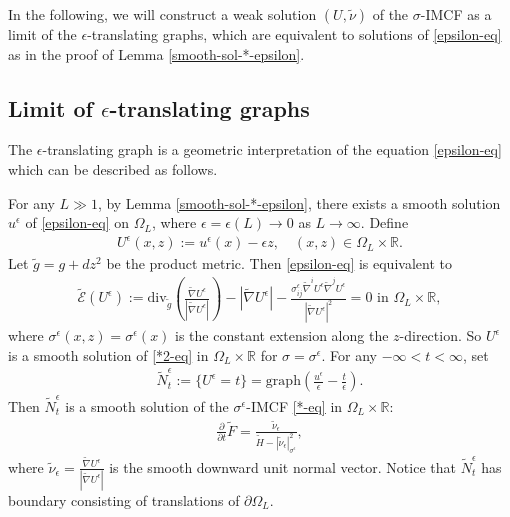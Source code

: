 \documentclass[11pt, letterpaper]{amsart}
\theoremstyle{definition}
\theoremstyle{remark}
\begin{document}
In the following, we will construct a weak solution $(U, \tilde{\nu })$ of the $\sigma $-IMCF as a limit of the $\epsilon $-translating graphs, which are equivalent to solutions of \ref{epsilon-eq} as in the proof of Lemma \ref{smooth-sol-*-epsilon}.

\subsection{Limit of $\epsilon $-translating graphs}\label{section-limit-translating}
 The $\epsilon $-translating graph is a geometric interpretation of the equation \ref{epsilon-eq}  which can be described as follows. 


 For any $L \gg 1$, by Lemma \ref{smooth-sol-*-epsilon}, there exists a smooth solution $u ^{\epsilon }$ of \ref{epsilon-eq} on $\Omega _{L}$, where $\epsilon = \epsilon (L) \to 0$ as $L\to \infty$. Define
\begin{align}
	U ^{\epsilon }(x,z):= u ^{\epsilon }(x) - \epsilon z,\quad (x,z) \in \Omega _{L} \times \mathbb{R}.
\end{align}
Let $\tilde{g}= g + dz ^2$ be the product metric. Then \ref{epsilon-eq} is equivalent to 
\begin{align}
	\tilde{\mathcal{E}}(U^{\epsilon }):= \mathrm{div}_{\tilde{g}}\left( \frac{\tilde{\nabla } U^{\epsilon }}{|\tilde{\nabla } U^{\epsilon }|} \right) - |\tilde{\nabla }U ^{\epsilon }| - \frac{\sigma ^{\epsilon } _{ij} \tilde{\nabla }^{i} U^{\epsilon } \tilde{\nabla }^{j} U^{\epsilon }}{|\tilde{\nabla }U^{\epsilon }|^2} = 0 \text{ in } \Omega _{L} \times \mathbb{R},
\end{align}
where $\sigma ^{\epsilon } (x,z) = \sigma ^{\epsilon }(x)$ is the constant extension along the $z$-direction. So $U^{\epsilon }$ is a smooth solution of \ref{*2-eq} in $\Omega _{L} \times \mathbb{R}$ for $\sigma = \sigma ^{\epsilon }$.  For any $-\infty< t< \infty$, set
\begin{align*}
	\tilde{N}^{\epsilon }_t := \{ U^{\epsilon }= t\} = \mathrm{graph} \left( \frac{u^{\epsilon }}{\epsilon } - \frac{t}{\epsilon } \right) .
\end{align*} 
Then $\tilde{N}^{\epsilon }_{t}$ is a smooth solution of the $\sigma ^{\epsilon } $-IMCF \ref{*-eq} in $\Omega _{L} \times \mathbb{R}$:
\begin{align*}
	\frac{\partial }{\partial t} \tilde{F} = \frac{\tilde{\nu }_{\epsilon }}{\tilde{H} - |\tilde{\nu }_{\epsilon }|^2_{\sigma ^{\epsilon } }},
\end{align*}
where $\tilde{\nu }_{\epsilon } = \frac{\tilde{\nabla }U^{\epsilon }}{|\tilde{\nabla }U^{\epsilon }|}$ is the smooth downward unit normal vector. 
Notice that $\tilde{N}^{\epsilon }_{t}$ has boundary consisting of translations of $\partial \Omega _{L}$. 
\end{document}

